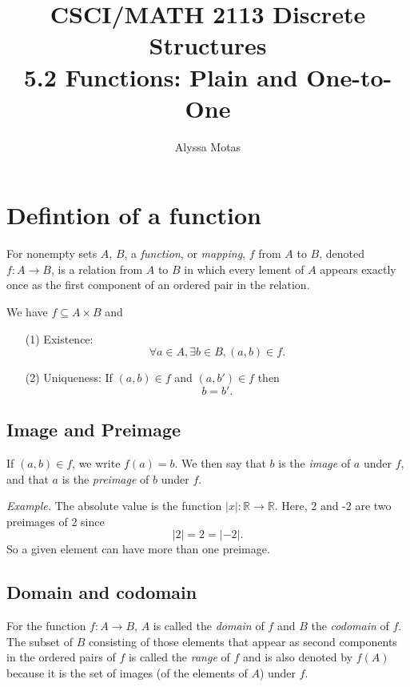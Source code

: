 \documentclass[11pt]{article}
\title{\textbf{CSCI/MATH 2113 Discrete Structures} \\ 5.2 Functions: Plain and One-to-One}
\author{Alyssa Motas}
\begin{document}
    \maketitle

    \pagebreak

    \tableofcontents

    \pagebreak

    \section{Defintion of a function}

    For nonempty sets $A$, $B$, a \emph{function}, or \emph{mapping}, $f$ from $A$ to $B$, denoted \(f: A \rightarrow B\), is a relation from $A$ to $B$ in which every lement of $A$ appears exactly once as the first component of an ordered pair in the relation. 

    \vspace{1em}

    We have \(f \subseteq A \times B\) and 
    \begin{enumerate}
        \item[(1)] Existence: \[\forall a \in A, \exists b \in B, (a,b) \in f.\]
        \item[(2)] Uniqueness: If \((a,b) \in f\) and \((a,b') \in f\) then \[b = b'.\]   
    \end{enumerate}

    \subsection{Image and Preimage}

    If \((a,b) \in f\), we write \(f(a)=b\). We then say that $b$ is the \emph{image} of $a$ under $f$, and that $a$ is the \emph{preimage} of $b$ under $f$.

    \vspace{1em}

    \emph{Example.} The absolute value is the function \(|x|: \mathbb{R} \rightarrow \mathbb{R}\). Here, 2 and -2 are two preimages of 2 since \[|2| = 2 = |-2|.\] So a given element can have more than one preimage.

    \subsection{Domain and codomain}

    For the function \(f: A \rightarrow B\), $A$ is called the \emph{domain} of $f$ and $B$ the \emph{codomain} of $f$. The subset of $B$ consisting of those elements that appear as second components in the ordered pairs of $f$ is called the \emph{range} of $f$ and is also denoted by $f(A)$ because it is the set of images (of the elements of $A$) under $f$.
\end{document}
